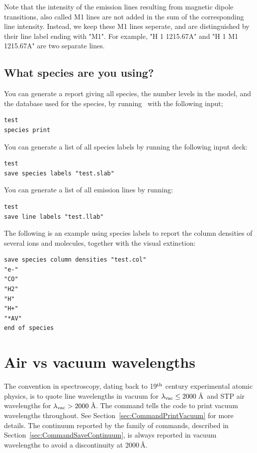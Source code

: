 Note that the intensity of the emission lines resulting from magnetic dipole
transitions, also called M1 lines are not added in the sum of the corresponding
line intensity. Instead, we keep these M1 lines seperate, and are distinguished
by their line label ending with "M1". For example, "H  1 1215.67A" and
"H  1 M1 1215.67A" are two separate lines.

\subsection{What species are you using?}

You can generate a report giving all species, the number levels in the model,
and the database used for the species,
by running \Cloudy\ with the following input;
\begin{verbatim}
test
species print
\end{verbatim}

You can generate a list of all species labels by running the following input deck:
\begin{verbatim}
test
save species labels "test.slab"
\end{verbatim}

You can generate a list of all emission lines by running:
\begin{verbatim}
test
save line labels "test.llab"
\end{verbatim}

The following is an example using species labels to report the column densities 
of several ions and molecules, together with the visual extinction:
\begin{verbatim}
save species column densities "test.col"
"e-"
"CO"
"H2"
"H"
"H+"
"*AV"
end of species
\end{verbatim}

\section{Air vs vacuum wavelengths}
\label{sec:AirVsVacuumWavelengths}
The convention in spectroscopy, dating back to 19$^{\rm th}$ century experimental atomic physics,
is to quote line wavelengths in vacuum for $\lambda_{\rm vac} \le 2000$\,\AA\ and STP air wavelengths
for $\lambda_{\rm vac} > 2000$\,\AA.
The  command
tells the code to print vacuum wavelengths throughout.
See Section~\ref{sec:CommandPrintVacuum} for more details.
The continuum reported by the family of  commands,
described in Section~\ref{sec:CommandSaveContinuum},
is always reported in vacuum wavelengths to avoid 
a discontinuity at 2000\,\AA.


